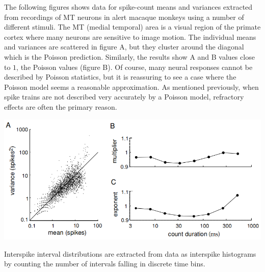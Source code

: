 \begin{exm}
  The following figures shows data for spike-count means and variances extracted
  from recordings of MT neurons in alert macaque monkeys using a number of different stimuli. The MT (medial temporal) area is a visual region of the primate cortex where many neurons are sensitive to image motion.
  The individual means and variances are scattered in figure A,  but they
  cluster around the diagonal which is the Poisson prediction. Similarly,  the
  results show A and B values close to $1$,  the Poisson values (figure B).
  Of course,  many neural responses cannot be described by Poisson statistics,  but it is reassuring to see a case where the Poisson model seems a
  reasonable approximation. As mentioned previously,  when spike trains
  are not described very accurately by a Poisson model,  refractory effects
  are often the primary reason.
  \begin{center}
    \label{fig:1.14}
    \includegraphics[scale = 0.3]{png/Fig_1_14.png}\\
  \end{center}
\end{exm}

\begin{rul}
    Interspike interval distributions are extracted from data as interspike histograms by counting the number of intervals falling in discrete time bins.
\end{rul}

